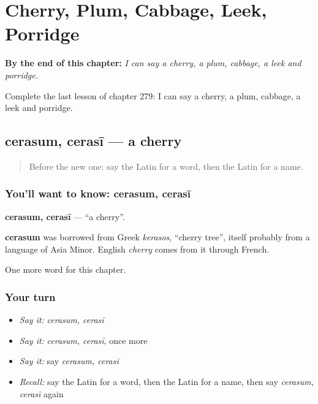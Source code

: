 
\chapter{Cherry, Plum, Cabbage, Leek, Porridge}
\label{ch:la-cherry-plum-cabbage-leek-porridge}

\begin{chapteropening}
\textbf{By the end of this chapter:} \emph{I can say a cherry, a plum, cabbage, a leek and porridge.}

Complete the last lesson of chapter 279: I can say a cherry, a plum, cabbage, a leek and porridge.
\end{chapteropening}

\section[cerasum, cerasī]{cerasum, cerasī — a cherry}

\label{lesson:LA-C279-cerasum}



\begin{quote}
Before the new one: say the Latin for a word, then the Latin for a name.
\end{quote}

\subsection*{You'll want to know: cerasum, cerasī}
\textbf{cerasum, cerasī} — \textquotedblleft{}a cherry\textquotedblright{}.

\begin{cousinweb}
\textbf{cerasum} was borrowed from Greek \emph{kerasos}, \textquotedblleft{}cherry tree\textquotedblright{}, itself probably from a language of Asia Minor. English \emph{cherry} comes from it through French.
\end{cousinweb}

\begin{grammarlens}[title={What you've built}]
One more word for this chapter.
\end{grammarlens}

\subsection*{Your turn}
\begin{itemize}
\raggedright
  \item \emph{Say it:} \emph{cerasum, cerasī}
  \item \emph{Say it:} \emph{cerasum, cerasī}, once more
  \item \emph{Say it:} say \emph{cerasum, cerasī}
  \item \emph{Recall:} say the Latin for a word, then the Latin for a name, then say \emph{cerasum, cerasī} again
\end{itemize}

